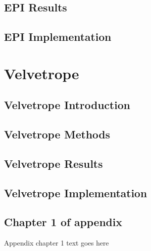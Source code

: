 \documentclass[phd,tocprelim]{cornell}
\begin{document}

\chapter{EPI Results} %
\label{cha:EPI Results}


\chapter{EPI Implementation} %
\label{cha:EPI Implementation}



\part{Velvetrope} %
\label{prt:Velvetrope}

\chapter{Velvetrope Introduction} %
\label{cha:Velvetrope Introduction}


\chapter{Velvetrope Methods} %
\label{cha:Velvetrope Methods}


\chapter{Velvetrope Results} %
\label{cha:Velvetrope Results}


\chapter{Velvetrope Implementation} %
\label{cha:Velvetrope Implementation}



\appendix
\chapter{Chapter 1 of appendix}
Appendix chapter 1 text goes here


\end{document}
